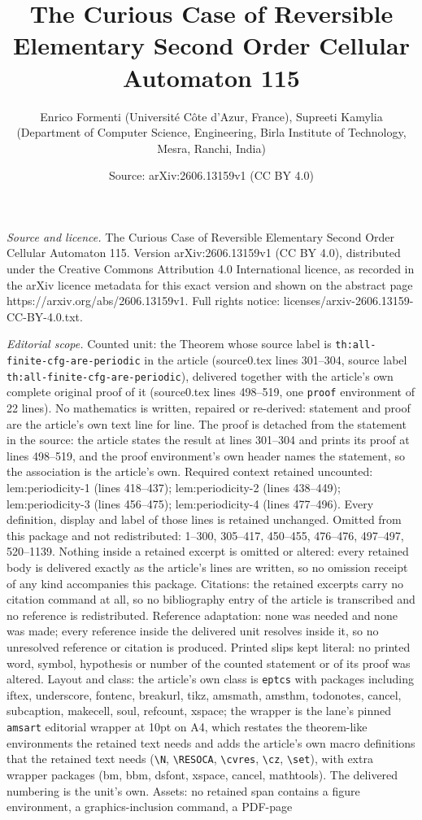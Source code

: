 \documentclass[10pt,a4paper]{amsart}
\title[The Curious Case of Reversible Elementary Second Order Cellu]{The Curious Case of Reversible Elementary Second Order Cellular Automaton 115}
\author{Enrico Formenti (Universit\'e C\^ote d'Azur, France), Supreeti Kamylia (Department of Computer Science, Engineering, Birla Institute of Technology, Mesra, Ranchi, India)}
\date{Source: arXiv:2606.13159v1 (CC BY 4.0)}
\begin{document}
\maketitle

\noindent\emph{Source and licence.} The Curious Case of Reversible Elementary Second Order Cellular Automaton 115. Version arXiv:2606.13159v1 (CC BY 4.0), distributed under the Creative Commons Attribution 4.0 International licence, as recorded in the arXiv licence metadata for this exact version and shown on the abstract page https://arxiv.org/abs/2606.13159v1. Full rights notice: licenses/arxiv-2606.13159-CC-BY-4.0.txt.\par\smallskip

\noindent\textit{Editorial scope.} Counted unit: the Theorem whose source label is \texttt{th:all-finite-cfg-are-periodic} in the article (source0.tex lines 301--304, source label \texttt{th:all-finite-cfg-are-periodic}), delivered together with the article's own complete original proof of it (source0.tex lines 498--519, one \texttt{proof} environment of 22 lines). No mathematics is written, repaired or re-derived: statement and proof are the article's own text line for line. The proof is detached from the statement in the source: the article states the result at lines 301--304 and prints its proof at lines 498--519, and the proof environment's own header names the statement, so the association is the article's own. Required context retained uncounted: lem:periodicity-1 (lines 418--437); lem:periodicity-2 (lines 438--449); lem:periodicity-3 (lines 456--475); lem:periodicity-4 (lines 477--496). Every definition, display and label of those lines is retained unchanged. Omitted from this package and not redistributed: 1--300, 305--417, 450--455, 476--476, 497--497, 520--1139. Nothing inside a retained excerpt is omitted or altered: every retained body is delivered exactly as the article's lines are written, so no omission receipt of any kind accompanies this package. Citations: the retained excerpts carry no citation command at all, so no bibliography entry of the article is transcribed and no reference is redistributed. Reference adaptation: none was needed and none was made; every reference inside the delivered unit resolves inside it, so no unresolved reference or citation is produced. Printed slips kept literal: no printed word, symbol, hypothesis or number of the counted statement or of its proof was altered. Layout and class: the article's own class is \texttt{eptcs} with packages including iftex, underscore, fontenc, breakurl, tikz, amsmath, amsthm, todonotes, cancel, subcaption, makecell, soul, refcount, xspace; the wrapper is the lane's pinned \texttt{amsart} editorial wrapper at 10pt on A4, which restates the theorem-like environments the retained text needs and adds the article's own macro definitions that the retained text needs (\texttt{\textbackslash N}, \texttt{\textbackslash RESOCA}, \texttt{\textbackslash cvres}, \texttt{\textbackslash cz}, \texttt{\textbackslash set}), with extra wrapper packages (bm, bbm, dsfont, xspace, cancel, mathtools). The delivered numbering is the unit's own. Assets: no retained span contains a figure environment, a graphics-inclusion command, a PDF-page 
\end{document}
